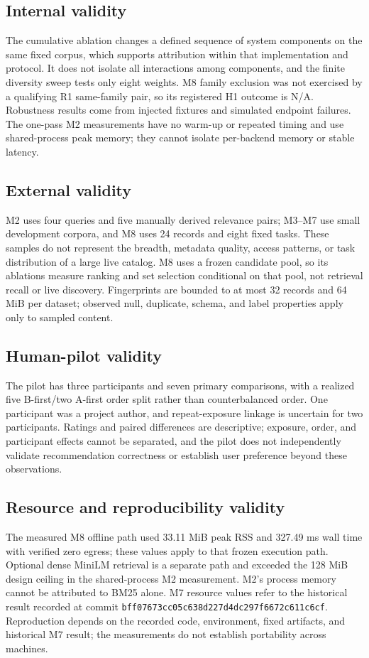 \documentclass[conference]{IEEEtran}
\begin{document}
\subsection{Internal validity}
The cumulative ablation changes a defined sequence of system components on the same fixed corpus, which supports attribution within that implementation and protocol. It does not isolate all interactions among components, and the finite diversity sweep tests only eight weights. M8 family exclusion was not exercised by a qualifying R1 same-family pair, so its registered H1 outcome is N/A. Robustness results come from injected fixtures and simulated endpoint failures. The one-pass M2 measurements have no warm-up or repeated timing and use shared-process peak memory; they cannot isolate per-backend memory or stable latency.

\subsection{External validity}
M2 uses four queries and five manually derived relevance pairs; M3--M7 use small development corpora, and M8 uses 24 records and eight fixed tasks. These samples do not represent the breadth, metadata quality, access patterns, or task distribution of a large live catalog. M8 uses a frozen candidate pool, so its ablations measure ranking and set selection conditional on that pool, not retrieval recall or live discovery. Fingerprints are bounded to at most 32 records and 64 MiB per dataset; observed null, duplicate, schema, and label properties apply only to sampled content.

\subsection{Human-pilot validity}
The pilot has three participants and seven primary comparisons, with a realized five B-first/two A-first order split rather than counterbalanced order. One participant was a project author, and repeat-exposure linkage is uncertain for two participants. Ratings and paired differences are descriptive; exposure, order, and participant effects cannot be separated, and the pilot does not independently validate recommendation correctness or establish user preference beyond these observations.

\subsection{Resource and reproducibility validity}
The measured M8 offline path used 33.11 MiB peak RSS and 327.49 ms wall time with verified zero egress; these values apply to that frozen execution path. Optional dense MiniLM retrieval is a separate path and exceeded the 128 MiB design ceiling in the shared-process M2 measurement. M2's process memory cannot be attributed to BM25 alone. M7 resource values refer to the historical result recorded at commit \texttt{bff07673cc05c638d227d4dc297f6672c611c6cf}. Reproduction depends on the recorded code, environment, fixed artifacts, and historical M7 result; the measurements do not establish portability across machines.
\end{document}
